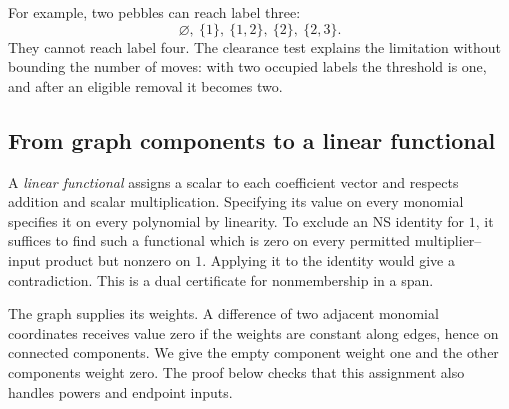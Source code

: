For example, two pebbles can reach label three:
\[
 \varnothing,\ \{1\},\ \{1,2\},\ \{2\},\ \{2,3\}.
\]
They cannot reach label four. The clearance test explains the limitation
without bounding the number of moves: with two occupied labels the
threshold is one, and after an eligible removal it becomes two.

\subsection{From graph components to a linear functional}
A \emph{linear functional} assigns a scalar to each coefficient vector
and respects addition and scalar multiplication. Specifying its value
on every monomial specifies it on every polynomial by linearity.
To exclude an NS identity for $1$, it suffices to find such a functional
which is zero on every permitted multiplier--input product but nonzero
on $1$. Applying it to the identity would give a contradiction.
This is a dual certificate for nonmembership in a span.

The graph supplies its weights. A difference of two adjacent monomial
coordinates receives value zero if the weights are constant along
edges, hence on connected components. We give the empty component
weight one and the other components weight zero. The proof below
checks that this assignment also handles powers and endpoint inputs.

